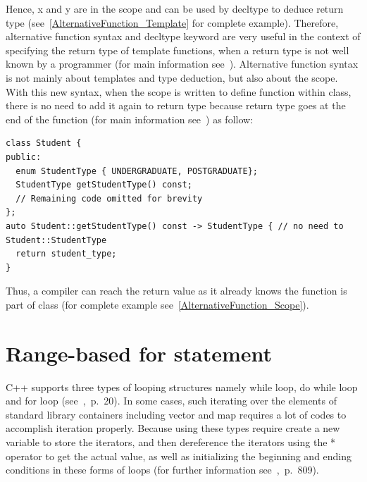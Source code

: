 \documentclass[11pt]{report}
\begin{document}
Hence, x and y are in the scope and can be used by decltype to deduce return type (see~\ref{AlternativeFunction_Template} for complete example). Therefore, alternative function syntax and decltype keyword are very useful in the context of specifying the return type of template functions, when a return type is not well known by a programmer (for main information see~\cite{Stroustrup:2012:Cpp11}). Alternative function syntax is not mainly about templates and type deduction, but also about the scope. With this new syntax, when the scope is written to define function within class, there is no need to add it again to return type because return type goes at the end of the function (for main information see~\cite{Allain:2011:FutureCpp}) as follow:
\begin{lstlisting}
class Student {
public:
  enum StudentType { UNDERGRADUATE, POSTGRADUATE};
  StudentType getStudentType() const;
  // Remaining code omitted for brevity
};
auto Student::getStudentType() const -> StudentType { // no need to Student::StudentType
  return student_type;
}
\end{lstlisting}
Thus, a compiler can reach the return value as it already knows the function is part of class (for complete example see~\ref{AlternativeFunction_Scope}).

\section{Range-based for statement}
\label{section: Range-based for statement}
C++ supports three types of looping structures namely while loop, do while loop and for loop (see~\cite{Gregorie:professionalcpp},~p.~20). In some cases, such iterating over the elements of standard library containers including vector and map requires a lot of codes to accomplish iteration properly. Because using these types require create a new variable to store the iterators, and then dereference the iterators using the * operator to get the actual value, as well as initializing the beginning and ending conditions in these forms of loops (for further information see~\cite{Horstmann:2008:BC},~p.~809).
\end{document}
